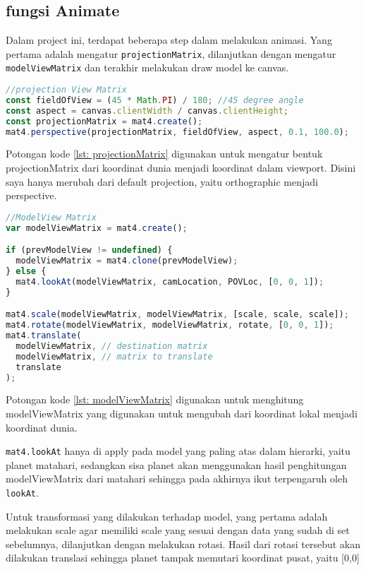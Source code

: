 \subsection*{fungsi Animate}

Dalam project ini, terdapat beberapa step dalam melakukan animasi. Yang pertama adalah mengatur \texttt{projectionMatrix}, dilanjutkan dengan mengatur \texttt{modelViewMatrix} dan terakhir melakukan draw model ke canvas.

\begin{lstlisting}[language=javascript, label={lst: projectionMatrix}, caption={mengatur projectionMatrix}]
//projection View Matrix
const fieldOfView = (45 * Math.PI) / 180; //45 degree angle
const aspect = canvas.clientWidth / canvas.clientHeight;
const projectionMatrix = mat4.create();
mat4.perspective(projectionMatrix, fieldOfView, aspect, 0.1, 100.0);

\end{lstlisting}

Potongan kode \ref{lst: projectionMatrix} digunakan untuk mengatur bentuk projectionMatrix dari koordinat dunia menjadi koordinat dalam viewport. Disini saya hanya merubah dari default projection, yaitu orthographic menjadi perspective.

\begin{lstlisting}[language=javascript, label={lst: modelViewMatrix}, caption={mengatur modelViewMatrix}]
//ModelView Matrix
var modelViewMatrix = mat4.create();

if (prevModelView != undefined) {
  modelViewMatrix = mat4.clone(prevModelView);
} else {
  mat4.lookAt(modelViewMatrix, camLocation, POVLoc, [0, 0, 1]);
}

mat4.scale(modelViewMatrix, modelViewMatrix, [scale, scale, scale]);
mat4.rotate(modelViewMatrix, modelViewMatrix, rotate, [0, 0, 1]);
mat4.translate(
  modelViewMatrix, // destination matrix
  modelViewMatrix, // matrix to translate
  translate
);
\end{lstlisting}

Potongan kode \ref{lst: modelViewMatrix} digunakan untuk menghitung modelViewMatrix yang digunakan untuk mengubah dari koordinat lokal menjadi koordinat dunia.

\texttt{mat4.lookAt} hanya di apply pada model yang paling atas dalam hierarki, yaitu planet matahari, sedangkan sisa planet akan menggunakan hasil penghitungan modelViewMatrix dari matahari sehingga pada akhirnya ikut terpengaruh oleh \texttt{lookAt}.

Untuk transformasi yang dilakukan terhadap model, yang pertama adalah melakukan scale agar memiliki scale yang sesuai dengan data yang sudah di set sebelumnya, dilanjutkan dengan melakukan rotasi. Hasil dari rotasi tersebut akan dilakukan translasi sehingga planet tampak memutari koordinat pusat, yaitu [0,0]

